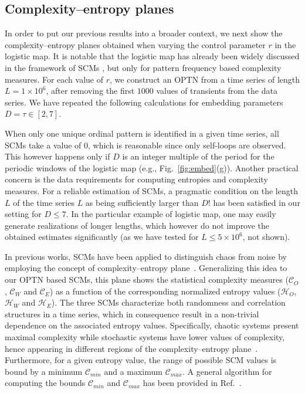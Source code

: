 \documentclass[12pt,aip,cha,reprint,nofootinbib]{revtex4-1}
\begin{document}
\subsection{Complexity--entropy planes} \label{sec:plane}

In order to put our previous results into a broader context, we next show the complexity--entropy planes obtained when varying the control parameter $r$ in the logistic map. It is notable that the logistic map has already been widely discussed in the framework of SCMs \cite{RossoPRE2007,MartinPLA2003}, but only for pattern frequency based complexity measures. For each value of $r$, we construct an OPTN from a time series of length $L = 1 \times 10 ^ 6$, after removing the first $1000$ values of transients from the data series. We have repeated the following calculations for embedding parameters $D = \tau \in [2, 7]$. 

When only one unique ordinal pattern is identified in a given time series, all SCMs take a value of $0$, which is reasonable since only self-loops are observed. This however happens only if $D$ is an integer multiple of the period for the periodic windows of the logistic map (e.g., Fig.~\ref{fig:embed}(g)). Another practical concern is the data requirements for computing entropies and complexity measures. For a reliable estimation of SCMs, a pragmatic condition on the length $L$ of the time series $L$ as being sufficiently larger than $D!$ \cite{rossoPRL2007,kowalskiPhyD2007} has been satisfied in our setting for $D \leq 7$. In the particular example of logistic map, one may easily generate realizations of longer lengths, which however do not improve the obtained estimates significantly (as we have tested for $L \leq 5 \times 10^6$, not shown). 

In previous works, SCMs have been applied to distinguish chaos from noise by employing the concept of complexity--entropy plane~\cite{rossoPRL2007}. Generalizing this idea to our OPTN based SCMs, this plane shows the statistical complexity measures ($\mathcal{C}_O$, $\mathcal{C}_W$ and $\mathcal{C}_E$) as a function of the corresponding normalized entropy values ($\mathcal{H}_O$, $\mathcal{H}_W$ and $\mathcal{H}_E$). The three SCMs characterize both randomness and correlation structures in a time series, which in consequence result in a non-trivial dependence on the associated entropy values. Specifically, chaotic systems present maximal complexity while stochastic systems have lower values of complexity, hence appearing in different regions of the complexity--entropy plane~\cite{rossoPRL2007}. Furthermore, for a given entropy value, the range of possible SCM values is bound by a minimum $\mathcal{C}_{min}$ and a maximum $\mathcal{C}_{max}$. A general algorithm for computing the bounds $\mathcal{C}_{min}$ and $\mathcal{C}_{max}$ has been provided in Ref.~\cite{martinPhyA2006}. 
\end{document}
